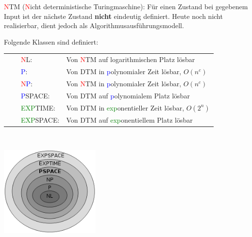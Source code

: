 \textcolor{red}{N}TM (\textcolor{red}{N}icht deterministische Turingmaschine): Für einen Zustand bei gegebenem Input ist der nächste Zustand \textbf{nicht} eindeutig definiert. Heute noch nicht realisierbar, dient jedoch als Algorithmusausführungsmodell.\\

\begin{minipage}{12cm}
Folgende Klassen sind definiert:\\
\newcommand{\tabitem}{~~\llap{\textbullet}~~}
\begin{tabular}{ll}
\tabitem \textcolor{red}{N}L:                       & Von \textcolor{red}{N}TM auf logarithmischen Platz lösbar \\ 
\tabitem \textcolor{blue}{P}:                       & Von DTM in \textcolor{blue}{p}olynomialer Zeit lösbar, $O(n^c)$\\
\tabitem \textcolor{red}{N}\textcolor{blue}{P}:     & Von \textcolor{red}{N}TM in \textcolor{blue}{p}olynomialer Zeit lösbar, $O(n^c)$\\
\tabitem \textcolor{blue}{P}SPACE:                  & Von DTM auf \textcolor{blue}{p}olynomialem Platz lösbar\\
\tabitem \textcolor{green}{EXP}TIME:                & Von DTM in \textcolor{green}{exp}onentieller Zeit lösbar, $O(2^n)$\\
\tabitem \textcolor{green}{EXP}SPACE:               & Von DTM auf \textcolor{green}{exp}onentiellem Platz lösbar
\end{tabular}
\end{minipage}~
\begin{minipage}{6cm}
\includegraphics[width=5cm]{images/Algorithmen/KomplexKlassen.png}
\end{minipage}\\ 

